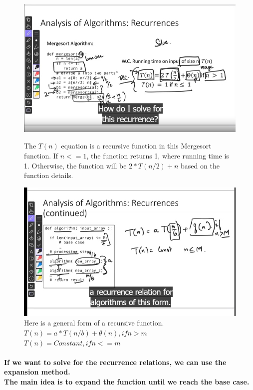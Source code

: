 \documentclass{article}
\begin{document}
\begin{figure}[h!]
    \includegraphics[width=\textwidth]{recurrencerelations.png}
    \caption{The $T(n)$ equation is a recursive function in this Mergesort function. 
    If $n<=1$, the function returns 1, where running time is 1. Otherwise, the function will be
    $2*T(n/2) + n$ based on the function details.\\}
    \includegraphics[width=\textwidth]{recurrencerelations2.png}
    \caption{Here is a general form of a recursive function. \\
    $T(n) = a*T(n/b) + \theta(n), if n > m$\\
    $T(n) = Constant, if n <= m$}
\end{figure}

\paragraph{If we want to solve for the recurrence relations, we can use the expansion method.\\
The main idea is to expand the function until we reach the base case.\\}
\end{document}
